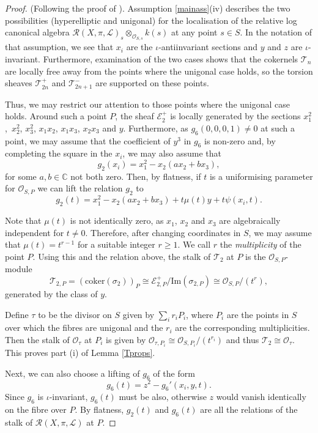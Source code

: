 \documentclass{amsart}
\begin{document}
\begin{proof} (Following the proof of \cite[Lemma 4.1]{flgi}). Assumption \ref{mainass}(iv) describes the two possibilities (hyperelliptic and unigonal) for the localisation of the relative log canonical algebra ${\mathcal{R}}(X,\pi,{\mathcal{L}})_s \otimes_{{\mathcal{O}}_{S,s}} k(s)$ at any point $s \in S$. In the notation of that assumption, we see that $x_i$ are the $\iota$-antiinvariant sections and $y$ and $z$ are $\iota$-invariant. Furthermore, examination of the two cases shows that the cokernels ${\mathcal{T}}_n$ are locally free away from the points where the unigonal case holds, so the torsion sheaves ${\mathcal{T}}^+_{2n}$ and ${\mathcal{T}}^-_{2n+1}$ are supported on these points.

Thus, we may restrict our attention to those points where the unigonal case holds. Around such a point $P$, the sheaf ${\mathcal{E}}^+_2$ is locally generated by the sections $x_1^2$,~$x_2^2$, $x_3^2$, $x_1x_2$, $x_1x_3$, $x_2x_3$ and $y$. Furthermore, as $g_6(0,0,0,1) \neq 0$ at such a point, we may assume that the coefficient of $y^3$ in $g_6$ is non-zero and, by completing the square in the $x_i$, we may also assume that
\[g_2(x_i) = x_1^2 - x_2(ax_2 + bx_3),\]
for some $a,b \in {\mathbb{C}}$ not both zero. Then, by flatness, if $t$ is a uniformising parameter for ${\mathcal{O}}_{S,P}$ we can lift the relation $g_2$ to
\[g_2(t) = x_1^2 - x_2(ax_2 + bx_3) + t \mu(t)y + t \psi(x_i,t).\]

Note that $\mu(t)$ is not identically zero, as $x_1$, $x_2$ and $x_3$ are algebraically independent for $t \neq 0$. Therefore, after changing coordinates in $S$, we may assume that $\mu(t) = t^{r-1}$ for a suitable integer $r \geq 1$. We call $r$ the \emph{multiplicity} of the point $P$. Using this and the relation above, the stalk of ${\mathcal{T}}_2$ at $P$ is the ${\mathcal{O}}_{S,P}$-module
\[ {\mathcal{T}}_{2,P} = (\mathrm{coker}(\sigma_2))_P \cong {\mathcal{E}}^+_{2,P} / \mathrm{Im}(\sigma_{2,P}) \cong {\mathcal{O}}_{S,P}/(t^r),\]
generated by the class of $y$.

Define $\tau$ to be the divisor on $S$ given by $\sum_i r_i P_i$, where $P_i$ are the points in $S$ over which the fibres are unigonal and the $r_i$ are the corresponding multiplicities. Then the stalk of ${\mathcal{O}}_{\tau}$ at $P_i$ is given by ${\mathcal{O}}_{\tau,P_i} \cong {\mathcal{O}}_{S,P_i}/(t^{r_i})$ and thus ${\mathcal{T}}_2 \cong {\mathcal{O}}_{\tau}$. This proves part (i) of Lemma \ref{Tprops}.

Next, we can also choose a lifting of $g_6$ of the form
\[g_6(t) = z^2 - g_6'(x_i,y,t).\]
Since $g_6$ is $\iota$-invariant, $g_6(t)$ must be also, otherwise $z$ would vanish identically on the fibre over $P$. By flatness, $g_2(t)$ and $g_6(t)$ are all the relations of the stalk of ${\mathcal{R}}(X,\pi,{\mathcal{L}})$ at $P$. 


\end{proof}
\end{document}
